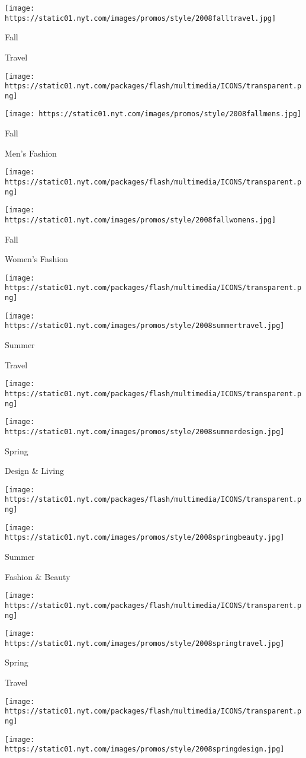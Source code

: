 \texttt{[image: https://static01.nyt.com/images/promos/style/2008falltravel.jpg]}

Fall

Travel

\texttt{[image: https://static01.nyt.com/packages/flash/multimedia/ICONS/transparent.png]}

\texttt{[image: https://static01.nyt.com/images/promos/style/2008fallmens.jpg]}

Fall

Men's Fashion

\texttt{[image: https://static01.nyt.com/packages/flash/multimedia/ICONS/transparent.png]}

\texttt{[image: https://static01.nyt.com/images/promos/style/2008fallwomens.jpg]}

Fall

Women's Fashion

\texttt{[image: https://static01.nyt.com/packages/flash/multimedia/ICONS/transparent.png]}

\texttt{[image: https://static01.nyt.com/images/promos/style/2008summertravel.jpg]}

Summer

Travel

\texttt{[image: https://static01.nyt.com/packages/flash/multimedia/ICONS/transparent.png]}

\texttt{[image: https://static01.nyt.com/images/promos/style/2008summerdesign.jpg]}

Spring

Design \& Living

\texttt{[image: https://static01.nyt.com/packages/flash/multimedia/ICONS/transparent.png]}

\texttt{[image: https://static01.nyt.com/images/promos/style/2008springbeauty.jpg]}

Summer

Fashion \& Beauty

\texttt{[image: https://static01.nyt.com/packages/flash/multimedia/ICONS/transparent.png]}

\texttt{[image: https://static01.nyt.com/images/promos/style/2008springtravel.jpg]}

Spring

Travel

\texttt{[image: https://static01.nyt.com/packages/flash/multimedia/ICONS/transparent.png]}

\texttt{[image: https://static01.nyt.com/images/promos/style/2008springdesign.jpg]}

